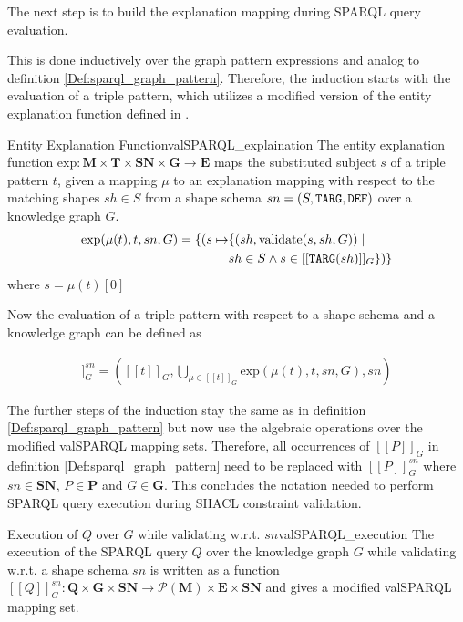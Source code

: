     The next step is to build the explanation mapping during SPARQL query evaluation. 
    
    This is done inductively over the graph pattern expressions and analog to definition \ref{Def:sparql_graph_pattern}. 
    Therefore, the induction starts with the evaluation of a triple pattern, which utilizes a modified version of the entity explanation function defined in \cite{valSPARQL}.
    \begin{Def}{Entity Explanation Function}{valSPARQL_explaination}
    The entity explanation function $\text{exp} : \mathbf{M} \times \mathbf{T} \times  \mathbf{SN} \times \mathbf{G} \to \mathbf{E}$ maps the substituted subject $s$ of a triple pattern $t$, given a mapping $\mu$ to an explanation mapping with respect to the matching shapes $sh \in S$ from a shape schema $sn = (S, \texttt{TARG}, \texttt{DEF})$ over a knowledge graph $G$. 
    \begin{align*}
        \text{exp}(\mu(t),t,sn,G) =  \{(s \mapsto & \{ (sh, \text{validate}(s,sh,G)) \mid\\ & sh \in S \land s \in [[\texttt{TARG}(sh)]]_G\})\}
    \end{align*}
    where $s = \mu(t)[0]$
    \end{Def}
    
    Now the evaluation of a triple pattern with respect to a shape schema and a knowledge graph can be defined as
    
    \begin{gather*}
        [[t]]_G^{sn} = ([[t]]_G, \bigcup_{\mu \in [[t]]_G} \text{exp}(\mu(t), t, sn, G), sn)
    \end{gather*}
    
    The further steps of the induction stay the same as in definition \ref{Def:sparql_graph_pattern} but now use the algebraic operations over the modified valSPARQL mapping sets. Therefore, all occurrences of $[[P]]_G$ in definition \ref{Def:sparql_graph_pattern} need to be replaced with $[[P]]_G^{sn}$ where $sn \in \mathbf{SN}$, $P \in \mathbf{P}$ and $G \in \mathbf{G}$.
        This concludes the notation needed to perform SPARQL query execution during SHACL constraint validation.
    
    \begin{Def}{Execution of $Q$ over $G$ while validating w.r.t. $sn$}{valSPARQL_execution}
        The execution of the SPARQL  query $Q$ over the knowledge graph $G$ while validating w.r.t. a shape schema $sn$ is written as a function $[[Q]]_G^{sn}: \mathbf{Q} \times \mathbf{G} \times \mathbf{SN} \to \mathcal{P}(\mathbf{M}) \times \mathbf{E} \times \mathbf{SN}$ and gives a modified valSPARQL mapping set.
    \end{Def}
    
